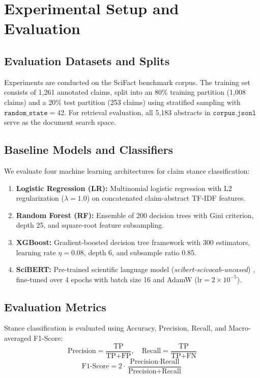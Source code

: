\documentclass[conference]{IEEEtran}
\begin{document}
\section{Experimental Setup and Evaluation}

\subsection{Evaluation Datasets and Splits}
Experiments are conducted on the SciFact benchmark corpus. The training set consists of 1,261 annotated claims, split into an 80\% training partition (1,008 claims) and a 20\% test partition (253 claims) using stratified sampling with $\texttt{random\_state}=42$. For retrieval evaluation, all 5,183 abstracts in $\texttt{corpus.jsonl}$ serve as the document search space.

\subsection{Baseline Models and Classifiers}
We evaluate four machine learning architectures for claim stance classification:
\begin{enumerate}
    \item \textbf{Logistic Regression (LR):} Multinomial logistic regression with L2 regularization ($\lambda = 1.0$) on concatenated claim-abstract TF-IDF features.
    \item \textbf{Random Forest (RF):} Ensemble of 200 decision trees with Gini criterion, depth 25, and square-root feature subsampling.
    \item \textbf{XGBoost:} Gradient-boosted decision tree framework with 300 estimators, learning rate $\eta = 0.08$, depth 6, and subsample ratio 0.85.
    \item \textbf{SciBERT:} Pre-trained scientific language model (\textit{scibert-scivocab-uncased}) \cite{beltagy2019scibert}, fine-tuned over 4 epochs with batch size 16 and AdamW ($\text{lr} = 2 \times 10^{-5}$).
\end{enumerate}

\subsection{Evaluation Metrics}
Stance classification is evaluated using Accuracy, Precision, Recall, and Macro-averaged F1-Score:
\begin{equation}
\text{Precision} = \frac{\text{TP}}{\text{TP} + \text{FP}}, \quad \text{Recall} = \frac{\text{TP}}{\text{TP} + \text{FN}}
\end{equation}
\begin{equation}
\text{F1-Score} = 2 \cdot \frac{\text{Precision} \cdot \text{Recall}}{\text{Precision} + \text{Recall}}
\end{equation}
\end{document}

